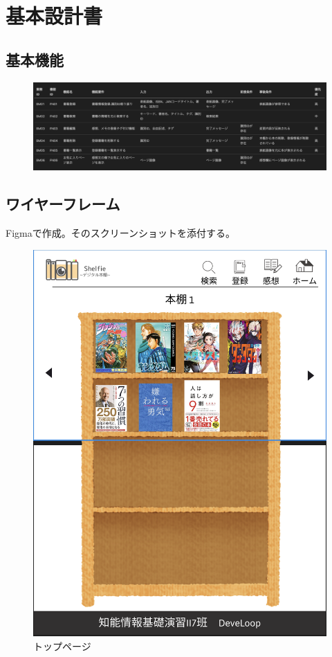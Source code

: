 \documentclass[a4paper, 11pt, titlepage]{jsarticle}
\begin{document}
\section{基本設計書}%
\subsection{基本機能}
\begin{figure}[htbp]
\centering
\includegraphics[width=120mm]{function.png}
\label{fig:func}
\end{figure}

\clearpage

\subsection{ワイヤーフレーム}
Figmaで作成。そのスクリーンショットを添付する。
\begin{figure}[htbp]
\centering
\includegraphics[width=120mm]{toppage.png}
\caption{トップページ}
\label{fig:func}
\end{figure}
\end{document}
